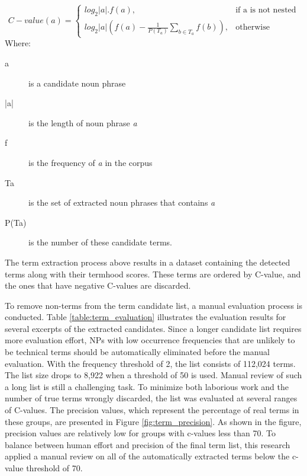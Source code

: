\documentclass[Journal, BackFigs, DoubleSpace]{ascelike} %
\begin{document}
\begin{enumerate} [label=\roman*]
	\begin{equation}
	C-value(a)=
	\begin{cases}
	log_2|a|.f(a), & \text{if a is not nested} \\
	log_2|a|(f(a)-\frac{1}{P(T_a)}\sum_{b\in T_a} f(b)), & \text{otherwise}
	\end{cases}
	\label{eq:cvalue}
	\end{equation}
	Where:
	\begin{description}
		\item[a] is a candidate noun phrase
		\item[|a|] is the length of noun phrase \textit{a}
		\item[f] is the frequency of \textit{a} in the corpus
		\item[Ta] is the set of extracted noun phrases that contains \textit{a}
		\item[P(Ta)] is the number of these candidate terms.
	\end{description}
\end{enumerate}
%
\par
The term extraction process above results in a dataset containing the detected terms along with their termhood scores. These terms are ordered by C-value, and the ones that have negative C-values are discarded. 
\par
To remove non-terms from the term candidate list, a manual evaluation process is conducted. Table \ref{table:term_evaluation} illustrates the evaluation results for several excerpts of the extracted candidates. Since a longer candidate list requires more evaluation effort, NPs with low occurrence frequencies that are unlikely to be technical terms should be automatically eliminated before the manual evaluation. With the frequency threshold of 2, the list consists of 112,024  terms. The list size drops to 8,922 when a threshold of 50 is used. Manual review of such a long list is still a challenging task. To minimize both laborious work and the number of true terms wrongly discarded, the list was evaluated at several ranges of C-values. The precision values, which represent the percentage of real terms in these groups, are presented in Figure \ref{fig:term_precision}. As shown in the figure, precision values are relatively low for groups with c-values less than 70. To balance between human effort and precision of the final term list, this research applied a manual review on all of the automatically extracted terms below the c-value threshold of 70.
\end{document}
